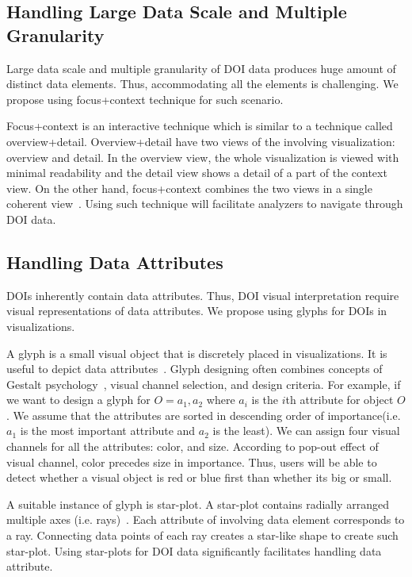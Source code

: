 \subsection{Handling Large Data Scale and Multiple Granularity}
\label{sec:LargeDataSupport}
Large data scale and multiple granularity of DOI data produces huge amount of distinct data elements. Thus, accommodating all the elements is challenging. We propose using focus+context technique for such scenario. 

Focus+context is an interactive technique which is similar to a technique called overview+detail. Overview+detail have two views of the involving visualization: overview and detail. In the overview view, the whole visualization is viewed with minimal readability and the detail view shows a detail of a part of the context view. On the other hand, focus+context combines the two views in a single coherent view~\cite{spence1982data}. Using such technique will facilitate analyzers to navigate through DOI data. 

\subsection{Handling Data Attributes}
\label{sec:DataAttributeSupport}
DOIs inherently contain data attributes. Thus, DOI visual interpretation require visual representations of data attributes. We propose using glyphs for DOIs in visualizations. 

A glyph is a small visual object that is discretely placed in visualizations. It is useful to depict data attributes~\cite{borgo2013glyph}. Glyph designing often combines concepts of Gestalt psychology~\cite{kohler1970gestalt}, visual channel selection, and design criteria. For example, if we want to design a glyph for $O = {a_1, a_2}$ where $a_i$ is the $i$th attribute for object $O$. We assume that the attributes are sorted in descending order of importance(i.e. $a_1$ is the most important attribute and $a_2$ is the least). We can assign four visual channels for all the attributes: color, and size. According to pop-out effect of visual channel, color precedes size in importance. Thus, users will be able to detect whether a visual object is red or blue first than whether its big or small. 

A suitable instance of glyph is star-plot. A star-plot contains radially arranged multiple axes (i.e. rays)~\cite{klippel2009star}. Each attribute of involving data element corresponds to a ray. Connecting data points of each ray creates a star-like shape to create such star-plot. Using star-plots for DOI data significantly facilitates handling data attribute. 

